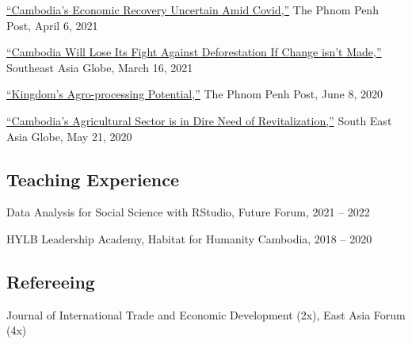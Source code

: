 \documentclass[10pt,a4paper]{article}
\begin{document}
	\href{https://www.phnompenhpost.com/opinion/cambodias-economic-recovery-uncertain-amid-covid}{``Cambodia's Economic Recovery Uncertain Amid Covid,''} The Phnom Penh Post, April 6, 2021\\ \vspace{-.5em}

	\href{https://southeastasiaglobe.com/cambodia-deforestation-fight/}{``Cambodia Will Lose Its Fight Against Deforestation If Change isn't Made,''} Southeast Asia Globe, March 16, 2021\\ \vspace{-.5em}

	\href{https://www.phnompenhpost.com/opinion/kingdoms-agro-processing-potential}{``Kingdom’s Agro-processing Potential,''} The Phnom Penh Post, June 8, 2020\\  \vspace{-.5em}

	 \href{https://southeastasiaglobe.com/cambodias-agricultural-sector-is-one-in-dire-need-of-revitalising}{``Cambodia’s Agricultural Sector is in Dire Need of Revitalization,''} South East Asia Globe, May 21, 2020

\subsection*{Teaching Experience}

Data Analysis for Social Science with RStudio, Future Forum, 2021 -- 2022
	
HYLB Leadership Academy, Habitat for Humanity Cambodia, 2018 -- 2020

\subsection*{Refereeing}
	
	Journal of International Trade and Economic Development (2x), East Asia Forum (4x)

\end{document}
